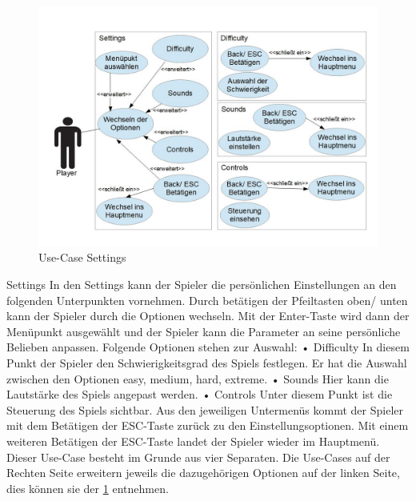 \documentclass{article}
\begin{document}

\begin{figure}
	\centering
	\includegraphics[width=1\textwidth]{UCS}
	\caption{Use-Case Settings
		\label{fig:UCS}}
\end{figure}

\noindent Settings\newline
In den Settings kann der Spieler die persönlichen Einstellungen an den folgenden Unterpunkten vornehmen.
Durch betätigen der Pfeiltasten oben/ unten kann der Spieler durch die Optionen wechseln. Mit der Enter-Taste wird
dann der Menüpunkt ausgewählt und der Spieler kann die Parameter an seine persönliche Belieben anpassen.
Folgende Optionen stehen zur Auswahl:\newline
• Difficulty\newline
In diesem Punkt der Spieler den Schwierigkeitsgrad des Spiels festlegen. Er hat die Auswahl zwischen den Optionen
easy, medium, hard, extreme.\newline
• Sounds\newline
Hier kann die Lautstärke des Spiels angepast werden.\newline
• Controls\newline
Unter diesem Punkt ist die Steuerung des Spiels sichtbar.\newline
\newline
Aus den jeweiligen Untermenüs kommt der Spieler mit dem Betätigen der ESC-Taste zurück zu den Einstellungsoptionen.
Mit einem weiteren Betätigen der ESC-Taste landet der Spieler wieder im Hauptmenü.\newline
\newline
Dieser Use-Case besteht im Grunde aus vier Separaten. Die Use-Cases auf der Rechten Seite erweitern jeweils die dazugehörigen
Optionen auf der linken Seite, dies können sie der \ref{fig:UCS} entnehmen. \newline
\end{document}
